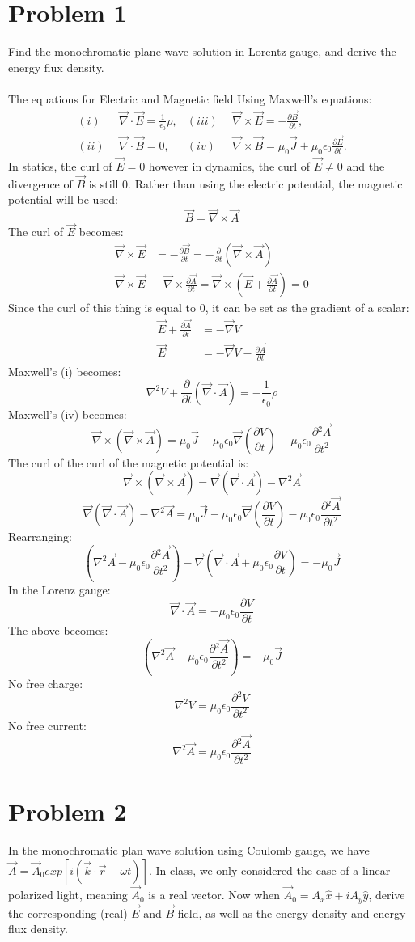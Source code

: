 \documentclass[a4paper,12pt]{article}
\newcommand{\V}[1]{\ensuremath{\vec{#1}}}
\newcommand{\F}[2]{\ensuremath{\frac{#1}{#2}}}
\newcommand{\Q}[1]{\newpage \section*{#1}}
\newcommand{\prt}[2]{\frac{\partial{#1}}{\partial{#2}}}
\begin{document}
\section*{Problem 1}
Find the monochromatic plane wave solution in Lorentz gauge, and derive the energy flux density.\\
\\
The equations for Electric and Magnetic field 
Using Maxwell's equations:
\begin{align*}
(i)&~~\V{\nabla}\cdot\V{E}=\F{1}{\epsilon_0}\rho,  &  (iii)&~~\V{\nabla}\times\V{E}=-\prt{\V{B}}{t},\\
(ii)&~~\V{\nabla}\cdot\V{B}=0,&  (iv)&~~\V{\nabla}\times\V{B}=\mu_0\V{J}+\mu_0\epsilon_0\prt{\V{E}}{t}.
\end{align*}
In statics, the curl of $\V{E}=0$ however in dynamics, the curl of $\V{E}\ne0$ and the divergence of $\V{B}$ is still 0. Rather than using the electric potential, the magnetic potential will be used:
\[\V{B}=\V{\nabla}\times\V{A}\]
The curl of $\V{E}$ becomes:
\begin{align*}
\V{\nabla}\times\V{E}&=-\prt{\V{B}}{t}=-\prt{}{t}(\V{\nabla}\times\V{A})\\
\V{\nabla}\times\V{E}&+\V{\nabla}\times\prt{\V{A}}{t}=\V{\nabla}\times\left(\V{E}+\prt{\V{A}}{t}\right)=0
\end{align*}
Since the curl of this thing is equal to 0, it can be set as the gradient of a scalar:
\begin{align*}
\V{E}+\prt{\V{A}}{t}&=-\V{\nabla}V\\
\V{E}&=-\V{\nabla}V-\prt{\V{A}}{t}
\end{align*}
Maxwell's (i) becomes:
\[\nabla^2V+\prt{}{t}(\V{\nabla}\cdot\V{A})=-\F{1}{\epsilon_0}\rho\]
Maxwell's (iv) becomes:
\[\V{\nabla}\times(\V{\nabla}\times\V{A})=\mu_0\V{J}-\mu_0\epsilon_0\V{\nabla}\left(\prt{V}{t}\right)-\mu_0\epsilon_0\prt{^2\V{A}}{t^2}\]
The curl of the curl of the magnetic potential is:
\[\V{\nabla}\times(\V{\nabla}\times\V{A})=\V{\nabla}(\V{\nabla}\cdot\V{A})-\nabla^2\V{A}\]
\[\V{\nabla}(\V{\nabla}\cdot\V{A})-\nabla^2\V{A}=\mu_0\V{J}-\mu_0\epsilon_0\V{\nabla}\left(\prt{V}{t}\right)-\mu_0\epsilon_0\prt{^2\V{A}}{t^2}\]
Rearranging:
\[\left(\nabla^2\V{A}-\mu_0\epsilon_0\prt{^2\V{A}}{t^2}\right)-\V{\nabla}\left(\V{\nabla}\cdot\V{A}+\mu_0\epsilon_0\prt{V}{t}\right)=-\mu_0\V{J}\]
In the Lorenz gauge:
\[\V{\nabla}\cdot\V{A}=-\mu_0\epsilon_0\prt{V}{t}\]
The above becomes:
\[\left(\nabla^2\V{A}-\mu_0\epsilon_0\prt{^2\V{A}}{t^2}\right)=-\mu_0\V{J}\]
No free charge:
\[\nabla^2V=\mu_0\epsilon_0\prt{^2V}{t^2}\]
No free current:
\[\nabla^2\V{A}=\mu_0\epsilon_0\prt{^2\V{A}}{t^2}\]


\Q{Problem 2}
In the monochromatic plan wave solution using Coulomb gauge, we have $\V{A}=\V{A}_0exp[i(\V{k}\cdot\V{r}-\omega t)]$.  In class, we only considered the case of a linear polarized light, meaning $\V{A}_0$ is a real vector.  Now when $\V{A}_0=A_x\hat{x}+iA_y\hat{y}$, derive the corresponding (real) $\V{E}$ and $\V{B}$ field, as well as the energy density and energy flux density.
\end{document}
